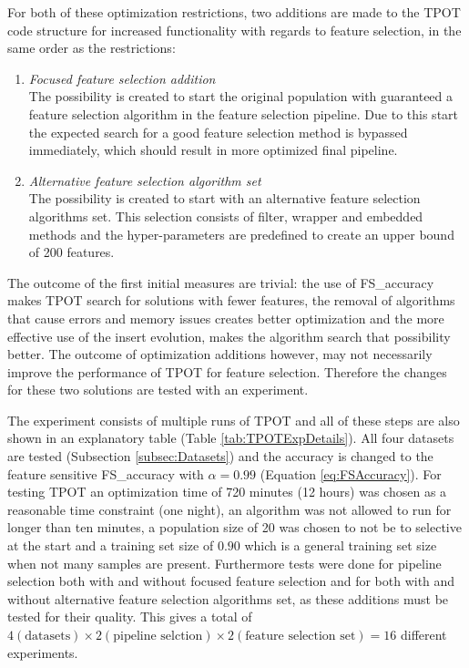 	For both of these optimization restrictions, two additions are made to the TPOT code structure for increased functionality with regards to feature selection, in the same order as the restrictions:
	
	\begin{enumerate}
		\item \textit{Focused feature selection addition} \\
		The possibility is created to start the original population with guaranteed a feature selection algorithm in the feature selection pipeline. Due to this start the expected search for a good feature selection method is bypassed immediately, which should result in more optimized final pipeline.
		\item \textit{Alternative feature selection algorithm set} \\
		The possibility is created to start with an alternative feature selection algorithms set. This selection consists of filter, wrapper and embedded methods and the hyper-parameters are predefined to create an upper bound of 200 features.
	\end{enumerate}
	
	The outcome of the first initial measures are trivial: the use of FS\_accuracy makes TPOT search for solutions with fewer features, the removal of algorithms that cause errors and memory issues creates better optimization and the more effective use of the insert evolution, makes the algorithm search that possibility better. The outcome of optimization additions however, may not necessarily improve the performance of TPOT for feature selection. Therefore the changes for these two solutions are tested with an experiment. 
	
	The experiment consists of multiple runs of TPOT and all of these steps are also shown in an explanatory table (Table \ref{tab:TPOTExpDetails}). All four datasets are tested (Subsection \ref{subsec:Datasets}) and the accuracy is changed to the feature sensitive FS\_accuracy with $\alpha = 0.99$ (Equation \ref{eq:FSAccuracy}). For testing TPOT an optimization time of 720 minutes (12 hours) was chosen as a reasonable time constraint (one night), an algorithm was not allowed to run for longer than ten minutes, a population size of 20 was chosen to not be to selective at the start and a training set size of $0.90$ which is a general training set size when not many samples are present. Furthermore tests were done for pipeline selection both with and without focused feature selection  and for both with and without alternative feature selection algorithms set, as these additions must be tested for their quality. This gives a total of $4 (\text{datasets}) \times 2 (\text{pipeline selction}) \times 2 (\text{feature selection set}) = 16$ different experiments.
	
